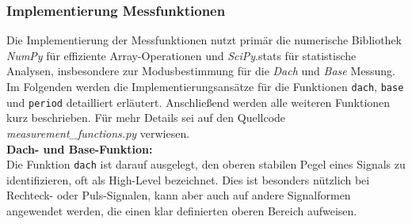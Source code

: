 \documentclass[a4paper, portrait, 12pt]{scrartcl} %
\begin{document}
\subsubsection{Implementierung Messfunktionen}
Die Implementierung der Messfunktionen nutzt primär die numerische Bibliothek \emph{NumPy} für effiziente Array-Operationen und \emph{SciPy}.stats für statistische Analysen, insbesondere zur Modusbestimmung für die \emph{Dach} und \emph{Base} Messung.\\


Im Folgenden werden die Implementierungsansätze für die Funktionen \texttt{dach}, 
\texttt{base} und \texttt{period} detailliert erläutert. Anschließend werden alle 
weiteren Funktionen kurz beschrieben. Für mehr Details sei auf den Quellcode \emph
{measurement\_functions.py} verwiesen.\\

\textbf{Dach- und Base-Funktion:}\\
Die Funktion \texttt{dach} ist darauf ausgelegt, den oberen stabilen Pegel eines Signals zu identifizieren, oft als High-Level bezeichnet. Dies ist besonders nützlich bei Rechteck- oder Puls-Signalen, kann aber auch auf andere Signalformen angewendet werden, die einen klar definierten oberen Bereich aufweisen.
\end{document}
